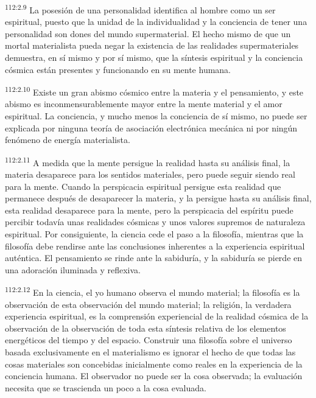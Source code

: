 \par
\textsuperscript{112:2.9} La posesión de una personalidad identifica al hombre como un ser espiritual, puesto que la unidad de la individualidad y la conciencia de tener una personalidad son dones del mundo supermaterial. El hecho mismo de que un mortal materialista pueda negar la existencia de las realidades supermateriales demuestra, en sí mismo y por sí mismo, que la síntesis espiritual y la conciencia cósmica están presentes y funcionando en su mente humana.

\par
\textsuperscript{112:2.10} Existe un gran abismo cósmico entre la materia y el pensamiento, y este abismo es inconmensurablemente mayor entre la mente material y el amor espiritual. La conciencia, y mucho menos la conciencia de sí mismo, no puede ser explicada por ninguna teoría de asociación electrónica mecánica ni por ningún fenómeno de energía materialista.

\par
\textsuperscript{112:2.11} A medida que la mente persigue la realidad hasta su análisis final, la materia desaparece para los sentidos materiales, pero puede seguir siendo real para la mente. Cuando la perspicacia espiritual persigue esta realidad que permanece después de desaparecer la materia, y la persigue hasta su análisis final, esta realidad desaparece para la mente, pero la perspicacia del espíritu puede percibir todavía unas realidades cósmicas y unos valores supremos de naturaleza espiritual. Por consiguiente, la ciencia cede el paso a la filosofía, mientras que la filosofía debe rendirse ante las conclusiones inherentes a la experiencia espiritual auténtica. El pensamiento se rinde ante la sabiduría, y la sabiduría se pierde en una adoración iluminada y reflexiva.

\par
\textsuperscript{112:2.12} En la ciencia, el yo humano observa el mundo material; la filosofía es la observación de esta observación del mundo material; la religión, la verdadera experiencia espiritual, es la comprensión experiencial de la realidad cósmica de la observación de la observación de toda esta síntesis relativa de los elementos energéticos del tiempo y del espacio. Construir una filosofía sobre el universo basada exclusivamente en el materialismo es ignorar el hecho de que todas las cosas materiales son concebidas inicialmente como reales en la experiencia de la conciencia humana. El observador no puede ser la cosa observada; la evaluación necesita que se trascienda un poco a la cosa evaluada.


